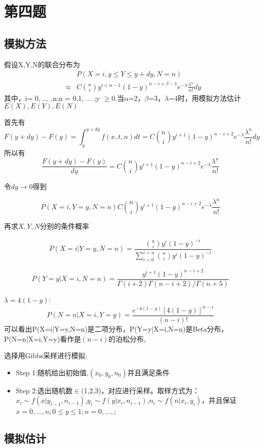 \documentclass{ctexart}
\begin{document}
   

\section{第四题}

\subsection{模拟方法}

假设X,Y,N的联合分布为
\begin{eqnarray*}
&& P(X=i,y \leq Y \leq y+dy,N=n) \\
&\approx& C{n \choose i}y^{i+\alpha-1}(1-y)^{n-i+\beta-1}e^{-\lambda}\frac{\lambda^n}{n!}dy
\end{eqnarray*}
其中，i= 0, ... ,n;n = 0,1, ... ;y $≥ $0.当$\alpha$=2，$\beta$=3，$\lambda$=4时，用模拟方法估计$ E(X),E(Y),E(N)$

首先有
$$F(y+dy)-F(y)=\int_{y}^{y+dy}f(x,t,n)dt=C{n \choose i}y^{i+1}(1-y)^{n-i+2}e^{-\lambda}\frac{\lambda^n}{n!}dy$$
所以有
$$\frac{F(y+dy)-F(y)}{dy}=C{n \choose i}y^{i+1}(1-y)^{n-i+2}e^{-\lambda}\frac{\lambda^n}{n!}$$

令$dy\rightarrow0$得到

$$P(X=i,Y=y,N=n)C{n \choose i}y^{i+1}(1-y)^{n-i+2}e^{-\lambda}\frac{\lambda^n}{n!}$$

再求$X,Y,N$分别的条件概率

$$P(X=i|Y=y,N=n)=\frac{ {n \choose i}y^i (1-y)^{-i}}{\sum_{i=0}^{i=n} {n \choose i}y^i (1-y)^{-i}}  $$

$$P(Y=y|X=i,N=n)=\frac{y^{i+1}(1-y)^{n-i+2}}{\Gamma(i+2) \Gamma(n-i+2)/\Gamma(n+5)}$$

$\lambda=4(1-y)$:
$$P(N=n|X=i,Y=y)=\frac{e^{-4(1-y)} [4(1-y)]^{n-i}}{(n-i)!}
$$
可以看出P(X=i|Y=y,N=n)是二项分布，P(Y=y|X=i,N=n)是Beta分布，P(N=n|X=i,Y=y)看作是$(n-i)$的泊松分布,

选择用Gibbs采样进行模拟:
\begin{itemize} 
\item Step 1:随机给出初始值,\((x_0,y_0,n_0) \)并且满足条件
\item Step 2:选出随机数$\in$(1,2,3)，对应进行采样。取样方式为：\(x_i  \sim f(x|y_{i-1},n_{i-1})\),\(y_i \sim f(y|x_i,n_{i-1})\),$n_i \sim f(n|x_i,y_i)$，并且保证$x=0,\dots,n ;0\leq y\leq 1;n=0,\dots,$;
\end{itemize}

\subsection{模拟估计}
\end{document}
